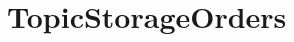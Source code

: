 \hypertarget{group___topic_storage_orders}{}\section{Topic\+Storage\+Orders}
\label{group___topic_storage_orders}
